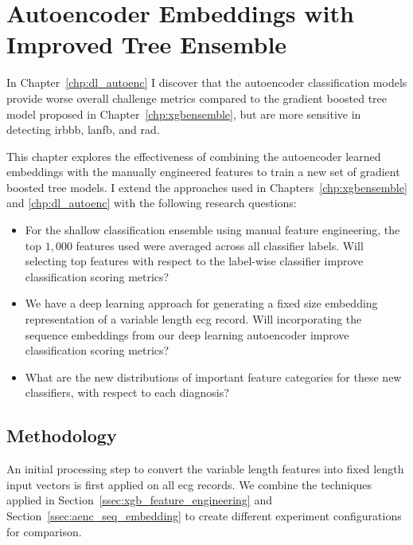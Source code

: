 \documentclass[\main/thesis.tex]{subfiles}
\begin{document}
\chapter{Autoencoder Embeddings with Improved Tree Ensemble}
\label{chp:aencxgb}

In Chapter~\ref{chp:dl_autoenc} I discover that the autoencoder classification models provide worse overall challenge metrics compared to the gradient boosted tree model proposed in Chapter~\ref{chp:xgbensemble}, but are more sensitive in detecting \gls{irbbb}, \gls{lanfb}, and \gls{rad}.

This chapter explores the effectiveness of combining the autoencoder learned embeddings with the manually engineered features to train a new set of gradient boosted tree models.
I extend the approaches used in Chapters~\ref{chp:xgbensemble} and \ref{chp:dl_autoenc} with the following research questions:
\begin{itemize}
    \item For the shallow classification ensemble using manual feature engineering, the top $1,000$ features used were averaged across all classifier labels. Will selecting top features with respect to the label-wise classifier improve classification scoring metrics?
    \item We have a deep learning approach for generating a fixed size embedding representation of a variable length \gls{ecg} record. Will incorporating the sequence embeddings from our deep learning autoencoder improve classification scoring metrics?
    \item What are the new distributions of important feature categories for these new classifiers, with respect to each diagnosis?
\end{itemize}

\section{Methodology}

An initial processing step to convert the variable length features into fixed length input vectors is first applied on all \gls{ecg} records.
We combine the techniques applied in Section~\ref{ssec:xgb_feature_engineering} and Section~\ref{ssec:aenc_seq_embedding} to create different experiment configurations for comparison.
\end{document}
